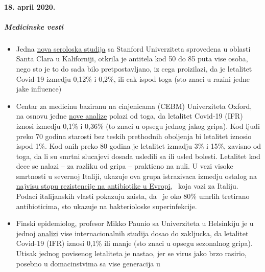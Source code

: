 \hypertarget{18-april-2020}{%
\paragraph{18. april 2020.}\label{18-april-2020}}

\hypertarget{medicinske-vesti-2}{%
\subparagraph{\texorpdfstring{\textbf{Medicinske
vesti}}{Medicinske vesti}}\label{medicinske-vesti-2}}

\begin{itemize}
\tightlist
\item
  Jedna
  \href{https://www.medrxiv.org/content/10.1101/2020.04.14.20062463v1}{nova
  seroloska studija} sa Stanford Univerziteta sprovedena u oblasti Santa
  Clara u Kaliforniji, otkrila je antitela kod 50 do 85 puta vise osoba,
  nego sto je to do sada bilo pretpostavljano, iz cega proizilazi, da je
  letalitet Covid-19 izmedju 0,12\% i 0,2\%, ili cak ispod toga (sto
  znaci u razini jedne jake influence)
\item
  Centar za medicinu baziranu na cinjenicama (CEBM) Univerziteta Oxford,
  na osnovu jedne
  \href{https://www.cebm.net/covid-19/global-covid-19-case-fatality-rates/}{nove
  analize} polazi od toga, da letalitet Covid-19 (IFR) iznosi izmedju
  0,1\% i 0,36\% (to znaci u opsegu jednog jakog gripa). Kod ljudi preko
  70 godina starosti bez teskih prethodnih oboljenja bi letalitet
  iznosio ispod 1\%. Kod onih preko 80 godina je letalitet izmadju 3\% i
  15\%, zavisno od toga, da li su smrtni slucajevi dosada usledili sa
  ili usled bolesti. Letalitet kod dece se nalazi -- za razliku od gripa
  -- prakticno na nuli. U vezi visoke smrtnosti u severnoj Italiji,
  ukazuje ova grupa istrazivaca izmedju ostalog na
  \href{https://www.ansa.it/english/news/science_tecnology/2019/11/19/italy-top-in-eu-in-antibiotic-resistance_369e0123-0107-445e-8c17-f11932c9d27c.html}{najvisu
  stopu rezistencije na antibiotike u Evropi}, ~koja vazi za Italiju.
  Podaci italijanskih vlasti pokazuju zaista, da ~je oko 80\% umrlih
  tretirano antibioticima, sto ukazuje na bakterioloske superinfekcije.
\item
  Finski epidemiolog, profesor Mikko Paunio sa Univerziteta u Helsinkiju
  je u jednoj
  \href{https://lockdownsceptics.org/wp-content/uploads/2020/04/How-the-World-got-Fooled-by-COVID-ed-2c.pdf}{analizi}
  vise internacionalnih studija dosao do zakljucka, da letalitet
  Covid-19 (IFR) iznosi 0,1\% ili manje (sto znaci u opsegu sezonalnog
  gripa). Utisak jednog povisenog letaliteta je nastao, jer se virus
  jako brzo rasirio, posebno u domacinstvima sa vise generacija u

\end{itemize}

